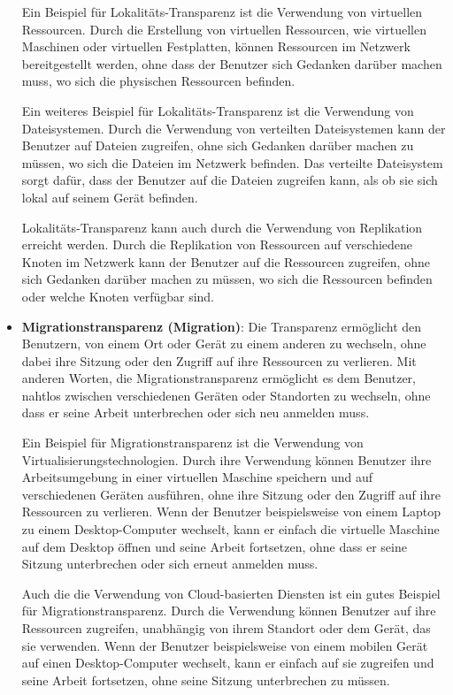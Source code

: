 \documentclass[../vs-script-first-v01.tex]{subfiles}
\begin{document}
\begin{itemize}
Ein Beispiel für Lokalitäts-Transparenz ist die Verwendung von virtuellen Ressourcen. Durch die Erstellung von virtuellen Ressourcen, wie virtuellen Maschinen oder virtuellen Festplatten, können Ressourcen im Netzwerk bereitgestellt werden, ohne dass der Benutzer sich Gedanken darüber machen muss, wo sich die physischen Ressourcen befinden.

Ein weiteres Beispiel für Lokalitäts-Transparenz ist die Verwendung von Dateisystemen. Durch die Verwendung von verteilten Dateisystemen kann der Benutzer auf Dateien zugreifen, ohne sich Gedanken darüber machen zu müssen, wo sich die Dateien im Netzwerk befinden. Das verteilte Dateisystem sorgt dafür, dass der Benutzer auf die Dateien zugreifen kann, als ob sie sich lokal auf seinem Gerät befinden.

Lokalitäts-Transparenz kann auch durch die Verwendung von Replikation erreicht werden. Durch die Replikation von Ressourcen auf verschiedene Knoten im Netzwerk kann der Benutzer auf die Ressourcen zugreifen, ohne sich Gedanken darüber machen zu müssen, wo sich die Ressourcen befinden oder welche Knoten verfügbar sind. 

\item \textbf{Migrationstransparenz (Migration)}: Die Transparenz ermöglicht den Benutzern, von einem Ort oder Gerät zu einem anderen zu wechseln, ohne dabei ihre Sitzung oder den Zugriff auf ihre Ressourcen zu verlieren. Mit anderen Worten, die Migrationstransparenz ermöglicht es dem Benutzer, nahtlos zwischen verschiedenen Geräten oder Standorten zu wechseln, ohne dass er seine Arbeit unterbrechen oder sich neu anmelden muss.

Ein Beispiel für Migrationstransparenz ist die Verwendung von Virtualisierungstechnologien. Durch ihre Verwendung können Benutzer ihre Arbeitsumgebung in einer virtuellen Maschine speichern und auf verschiedenen Geräten ausführen, ohne ihre Sitzung oder den Zugriff auf ihre Ressourcen zu verlieren. Wenn der Benutzer beispielsweise von einem Laptop zu einem Desktop-Computer wechselt, kann er einfach die virtuelle Maschine auf dem Desktop öffnen und seine Arbeit fortsetzen, ohne dass er seine Sitzung unterbrechen oder sich erneut anmelden muss.

Auch die die Verwendung von Cloud-basierten Diensten ist ein gutes Beispiel für Migrationstransparenz. Durch die Verwendung  können Benutzer auf ihre Ressourcen zugreifen, unabhängig von ihrem Standort oder dem Gerät, das sie verwenden. Wenn der Benutzer beispielsweise von einem mobilen Gerät auf einen Desktop-Computer wechselt, kann er einfach auf sie zugreifen und seine Arbeit fortsetzen, ohne seine Sitzung unterbrechen zu müssen.


\end{itemize}
\end{document}
